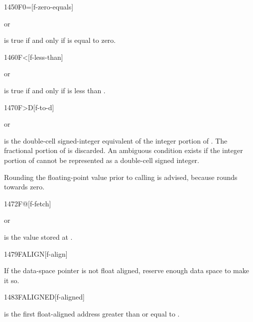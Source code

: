 \begin{worddef}{1450}{F0=}[f-zero-equals]
\item {}  or

	 is true if and only if  is equal to
	zero.
\end{worddef}


\begin{worddef}[Fless]{1460}{F<}[f-less-than]
\item {}  or

	 is true if and only if  is less than
	.
\end{worddef}


\begin{worddef}[FtoD]{1470}{F>D}[f-to-d]
\item {}  or

	 is the double-cell signed-integer equivalent of the
	integer portion of . The fractional portion of 
	is discarded. An ambiguous condition exists if the integer portion
	of  cannot be represented as a double-cell
	signed integer.

\note Rounding the floating-point value prior to calling 
	is advised, because  rounds towards zero.
\end{worddef}


\begin{worddef}{1472}{F@}[f-fetch]
\item {}  or

	 is the value stored at .
\end{worddef}


\begin{worddef}{1479}{FALIGN}[f-align]
\item \stack{}{}

	If the data-space pointer is not float aligned, reserve enough
	data space to make it so.
\end{worddef}


\begin{worddef}{1483}{FALIGNED}[f-aligned]
\item {}

	 is the first float-aligned address greater than
	or equal to .
\end{worddef}

